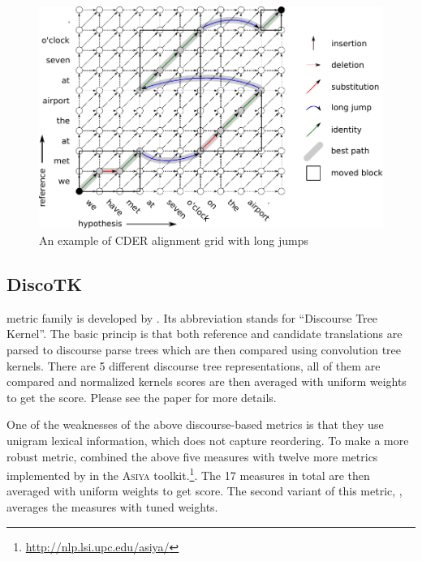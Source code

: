 \begin{figure}
    \begin{center}
        \includegraphics[width=12cm]{img/cder-grid.pdf}
    \end{center}

    \caption{An example of CDER alignment grid with long jumps}
    \label{cder-grid}
\end{figure}

\subsection{DiscoTK}

 metric family is developed by .
Its abbreviation stands for ``Discourse Tree Kernel''. The basic princip is
that both reference and candidate translations are parsed to discourse parse
trees which are then compared using convolution tree kernels. There are 5
different discourse tree representations, all of them are compared and
normalized kernels scores are then averaged with uniform weights to get the
 score.  Please see the paper for more details.

One of the weaknesses of the above discourse-based metrics is that they use
unigram lexical information, which does not capture reordering. To make a more
robust metric,  combined the above five measures
with twelve more metrics implemented by  in the
\textsc{Asiya} toolkit.\footnote{\url{http://nlp.lsi.upc.edu/asiya/}}. The 17
measures in total are then averaged with uniform weights to get
 score. The second variant of this metric,
, averages the measures with tuned weights.

